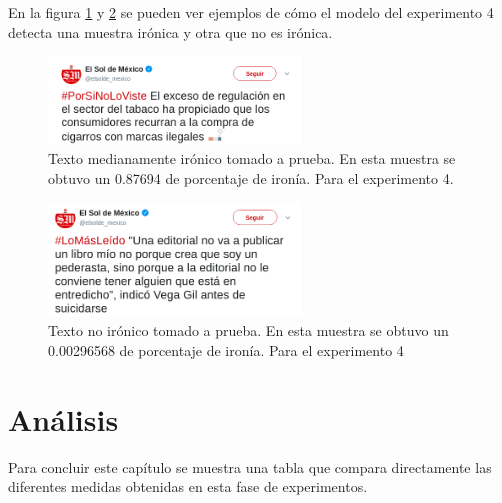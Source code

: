 \par En la figura \ref{fig:ironyTest3} y \ref{fig:ironyTest4} se pueden ver ejemplos de cómo el modelo del experimento 4 detecta una muestra irónica y otra que no es irónica.

\begin{figure}[h]
	\centering
	\includegraphics[width=0.6\textwidth]{imagenes/ironia3.png}
	\caption{Texto medianamente irónico tomado a prueba. En esta muestra se obtuvo un 0.87694 de porcentaje de ironía. Para el experimento 4.} %
	\label{fig:ironyTest3}
\end{figure}

\begin{figure}[h]
	\centering
	\includegraphics[width=0.6\textwidth]{imagenes/ironia4.png}
	\caption{Texto no irónico tomado a prueba. En esta muestra se obtuvo un 0.00296568 de porcentaje de ironía. Para el experimento 4} %
	\label{fig:ironyTest4}
\end{figure}

\section{Análisis}
\par Para concluir este capítulo se muestra una tabla que compara directamente las diferentes medidas obtenidas en esta fase de experimentos.

\begin{center}
	\begin{table}[H]
		\centering
		
		\label{tab:total}
	\end{table}
\end{center}

